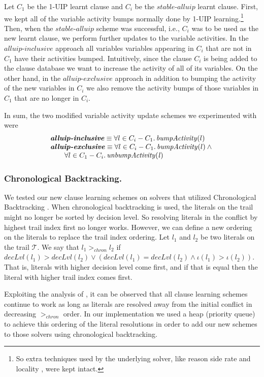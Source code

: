 \documentclass[runningheads]{llncs}
\newcommand{\oneuip}{1-UIP\xspace}
\newcommand{\stablealluip}{\textit{stable-alluip}\xspace}
\newcommand{\allUipIn}{\textit{alluip-inclusive}}
\newcommand{\allUipEx}{\textit{alluip-exclusive}}
\newcommand{\trail}{\ensuremath{\mathcal{T}}}
\newcommand{\trailIdx}[1]{\ensuremath{\iota(#1)}}
\newcommand{\dlevel}[1]{\ensuremath{\mathit{decLvl}(#1)}}
\begin{document}
Let $C_1$ be the \oneuip learnt clause and $C_i$ be the $\stablealluip$ learnt
clause. First, we kept all of the variable activity bumps normally
done by \oneuip learning.\footnote{So extra techniques used by the
  underlying solver, like reason side rate and locality
  \cite{DBLP:conf/sat/LiangGPC16}, were kept intact.}  Then, when the
$\stablealluip$ scheme was successful, i.e., $C_i$ was to be used as the new
learnt clause, we perform further updates to the variable
activities. In the $\allUipIn$ approach all variables variables
appearing in $C_i$ that are not in $C_1$ have their activities
bumped. Intuitively, since the clause $C_i$ is being added to the
clause database we want to increase the activity of all of its
variables. On the other hand, in the $\allUipEx$ approach in addition
to bumping the activity of the new variables in $C_i$ we also remove
the activity bumps of those variables in $C_1$ that are no longer in
$C_i$.

In sum, the two modified variable activity update schemes we
experimented with were
\[
    \begin{array}{l}
    \textbf{\allUipIn} \equiv \forall l\in C_i - C_1.\,\mathit{bumpActivity}(l) \\
    \textbf{\allUipEx} \equiv \forall l\in C_i - C_1.\,\mathit{bumpActivity}(l) \land\mbox{} \\
    \qquad \forall l\in C_1 - C_i.\,\mathit{unbumpActivity(l)}
  \end{array}
\]

\subsubsection{Chronological Backtracking.}
We tested our new clause learning schemes on solvers that utilized
Chronological Backtracking
\cite{DBLP:conf/sat/NadelR18,DBLP:conf/sat/MohleB19}. When
chronological backtracking is used, the literals on the trail might no
longer be sorted by decision level. So resolving literals in the
conflict by highest trail index first no longer works. However, we can
define a new ordering on the literals to replace the trail index
ordering. Let $l_1$ and $l_2$ be two literals on the trail
$\trail$. We say that $l_1 >_{\mathit{chron}} l_2$ if
$\dlevel{l_1} > \dlevel{l_2} \lor (\dlevel{l_1} = \dlevel{l_2} \land
\trailIdx{l_1} > \trailIdx{l_2})$. That is, literals with higher
decision level come first, and if that is equal then the literal with
higher trail index comes first.

Exploiting the analysis of \cite{DBLP:conf/sat/MohleB19}, it can be
observed that all clause learning schemes continue to work as long as
literals are resolved away from the initial conflict in decreasing
$>_{\mathit{chron}}$ order. In our implementation we used a heap
(priority queue) to achieve this ordering of the literal resolutions
in order to add our new schemes to those solvers using chronological
backtracking.
\end{document}
